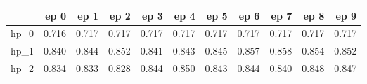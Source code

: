 \begin{tabular}{lrrrrrrrrrr}
\toprule
{} &   ep 0 &   ep 1 &   ep 2 &   ep 3 &   ep 4 &   ep 5 &   ep 6 &   ep 7 &   ep 8 &   ep 9 \\
\midrule
hp\_0 &  0.716 &  0.717 &  0.717 &  0.717 &  0.717 &  0.717 &  0.717 &  0.717 &  0.717 &  0.717 \\
hp\_1 &  0.840 &  0.844 &  0.852 &  0.841 &  0.843 &  0.845 &  0.857 &  0.858 &  0.854 &  0.852 \\
hp\_2 &  0.834 &  0.833 &  0.828 &  0.844 &  0.850 &  0.843 &  0.844 &  0.840 &  0.848 &  0.847 \\
\bottomrule
\end{tabular}
